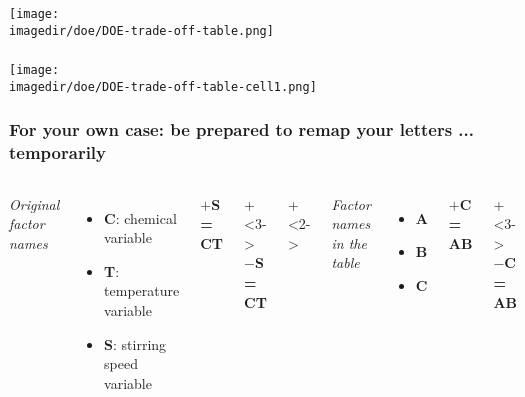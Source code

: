 \begin{frame}\frametitle{}
	\begin{center}
	\texttt{[image: \\imagedir/doe/DOE-trade-off-table.png]}
	\end{center}
\end{frame}

\begin{frame}\frametitle{}
	\begin{center}
	\texttt{[image: \\imagedir/doe/DOE-trade-off-table-cell1.png]}
	\end{center}
\end{frame}

\begin{frame}\frametitle{For your own case: be prepared to remap your letters ... temporarily}
	\begin{columns}[b]
			\emph{Original factor names}
			
			\begin{itemize}
				\item	\textbf{C}: chemical variable
				\item	\textbf{T}: temperature variable
				\item	\textbf{S}: stirring speed variable
			\end{itemize}
			
			\vspace{1cm}
			\textbf{$+$S = CT}
			
		\onslide+<3->{
			\vspace{1cm}
			\textbf{$-$S = CT}
		}
			
		\onslide+<2->{
			\emph{Factor names in the table}
			
			\begin{itemize}
				\item	\textbf{A}
				\item	\textbf{B}
				\item	\textbf{C}
			\end{itemize}
			
			\vspace{1cm}
			\textbf{$+$C = AB}
		}
		
		\onslide+<3->{	
			\vspace{1cm}
			\textbf{$-$C = AB}
		}
	\end{columns}	
\end{frame}

